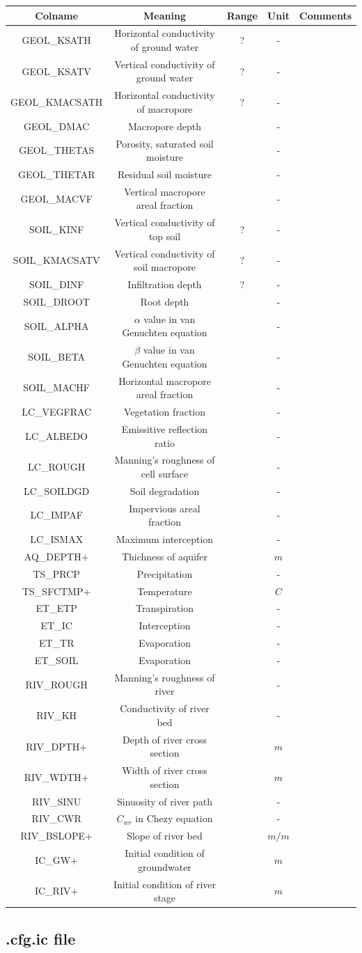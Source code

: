 \documentclass[]{scrbook}
\begin{document}
\begin{longtable}[]{@{}ccccc@{}}
\toprule
Colname & Meaning & Range & Unit & Comments\tabularnewline
\midrule
\endhead
GEOL\_KSATH & Horizontal conductivity of ground water & ? & -
&\tabularnewline
GEOL\_KSATV & Vertical conductivity of ground water & ? & -
&\tabularnewline
GEOL\_KMACSATH & Horizontal conductivity of macropore & ? & -
&\tabularnewline
GEOL\_DMAC & Macropore depth & & - &\tabularnewline
GEOL\_THETAS & Porosity, saturated soil moisture & & - &\tabularnewline
GEOL\_THETAR & Residual soil moisture & & - &\tabularnewline
GEOL\_MACVF & Vertical macropore areal fraction & & - &\tabularnewline
SOIL\_KINF & Vertical conductivity of top soil & ? & - &\tabularnewline
SOIL\_KMACSATV & Vertical conductivity of soil macropore & ? & -
&\tabularnewline
SOIL\_DINF & Infiltration depth & ? & - &\tabularnewline
SOIL\_DROOT & Root depth & & - &\tabularnewline
SOIL\_ALPHA & \(\alpha\) value in van Genuchten equation & & -
&\tabularnewline
SOIL\_BETA & \(\beta\) value in van Genuchten equation & & -
&\tabularnewline
SOIL\_MACHF & Horizontal macropore areal fraction & & - &\tabularnewline
LC\_VEGFRAC & Vegetation fraction & & - &\tabularnewline
LC\_ALBEDO & Emissitive reflection ratio & & - &\tabularnewline
LC\_ROUGH & Manning's roughness of cell surface & & - &\tabularnewline
LC\_SOILDGD & Soil degradation & & - &\tabularnewline
LC\_IMPAF & Impervious areal fraction & & - &\tabularnewline
LC\_ISMAX & Maximum interception & & - &\tabularnewline
AQ\_DEPTH+ & Thichness of aquifer & & \(m\) &\tabularnewline
TS\_PRCP & Precipitation & & - &\tabularnewline
TS\_SFCTMP+ & Temperature & & \(C\) &\tabularnewline
ET\_ETP & Transpiration & & - &\tabularnewline
ET\_IC & Interception & & - &\tabularnewline
ET\_TR & Evaporation & & - &\tabularnewline
ET\_SOIL & Evaporation & & - &\tabularnewline
RIV\_ROUGH & Manning's roughness of river & & - &\tabularnewline
RIV\_KH & Conductivity of river bed & & - &\tabularnewline
RIV\_DPTH+ & Depth of river cross section & & \(m\) &\tabularnewline
RIV\_WDTH+ & Width of river cross section & & \(m\) &\tabularnewline
RIV\_SINU & Sinuosity of river path & & - &\tabularnewline
RIV\_CWR & \(C_{wr}\) in Chezy equation & & - &\tabularnewline
RIV\_BSLOPE+ & Slope of river bed & & \(m/m\) &\tabularnewline
IC\_GW+ & Initial condition of groundwater & & \(m\) &\tabularnewline
IC\_RIV+ & Initial condition of river stage & & \(m\) &\tabularnewline
\bottomrule
\end{longtable}

\subsection{.cfg.ic file}\label{cfg.ic-file}
\end{document}
